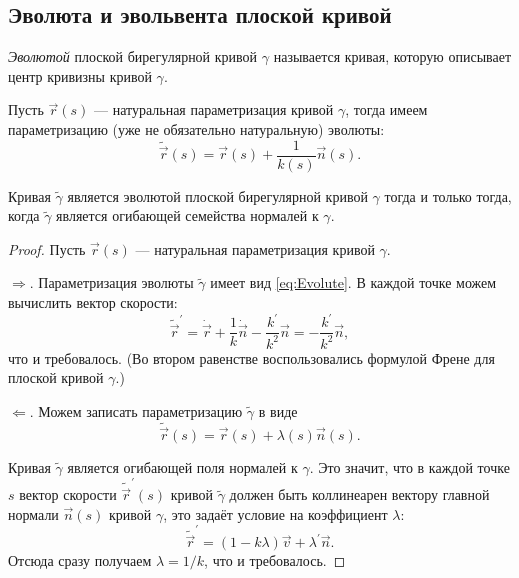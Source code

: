 \subsection{Эволюта и эвольвента плоской кривой \label{section:EvoluteInvolute}}

\begin{definition}
	\textit{Эволютой} плоской бирегулярной кривой $\gamma$ называется кривая, которую описывает центр кривизны кривой $\gamma$.
\end{definition}

Пусть $\vec{r}(s)$ --- натуральная параметризация кривой $\gamma$, тогда имеем параметризацию (уже не обязательно натуральную) эволюты:
\begin{equation} \label{eq:Evolute}
	\widetilde{\vec{r}}(s) = \vec{r}(s) + \frac{1}{k(s)}\vec{n}(s).
\end{equation}

\begin{proposition} \label{proposition:NormalEnvelope}
	Кривая $\widetilde{\gamma}$ является эволютой плоской бирегулярной кривой $\gamma$ тогда и только тогда, когда $\widetilde{\gamma}$ является огибающей семейства нормалей к $\gamma$.
\end{proposition}

\begin{proof}
	Пусть $\vec{r}(s)$ --- натуральная параметризация кривой $\gamma$.

	$\Rightarrow$. Параметризация эволюты $\widetilde{\gamma}$ имеет вид \eqref{eq:Evolute}. В каждой точке можем вычислить вектор скорости:\footnotemark
	\[
		\widetilde{\vec{r}}^\prime = \dot{\vec{r}} + \frac{1}{k}\dot{\vec{n}} - \frac{k^\prime}{k^2}\vec{n} = -\frac{k^\prime}{k^2}\vec{n},
	\]
	что и требовалось. (Во втором равенстве воспользовались формулой Френе для плоской кривой $\gamma$.)

	$\Leftarrow$. Можем записать параметризацию $\widetilde{\gamma}$ в виде
	\[
		\widetilde{\vec{r}}(s) = \vec{r}(s) + \lambda(s)\vec{n}(s).
	\]

	Кривая $\widetilde{\gamma}$ является огибающей поля нормалей к $\gamma$. Это значит, что в каждой точке $s$ вектор скорости $\widetilde{\vec{r}}^\prime(s)$ кривой $\widetilde{\gamma}$ должен быть коллинеарен вектору главной нормали $\vec{n}(s)$ кривой $\gamma$, это задаёт условие на коэффициент $\lambda$:
	\[
		\widetilde{\vec{r}}^\prime = (1 - k\lambda)\vec{v} + \lambda^\prime\vec{n}.
	\]
	Отсюда сразу получаем $\lambda = 1 / k$, что и требовалось.
\end{proof}

